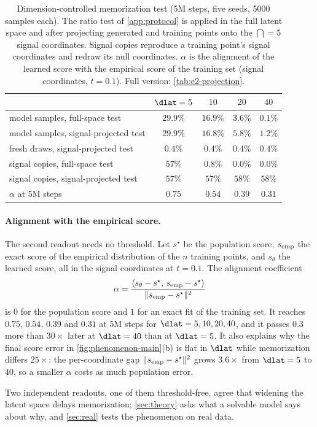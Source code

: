 \begin{table}[t]
  \centering\small
  \caption{Dimension-controlled memorization test (5M steps, five seeds, 5000 samples each). The ratio test of \cref{app:protocol} is applied in the full latent space and after projecting generated and training points onto the $\dint=5$ signal coordinates. Signal copies reproduce a training point's signal coordinates and redraw its null coordinates. $\alpha$ is the alignment of the learned score with the empirical score of the training set (signal coordinates, $t=0.1$). Full version: \cref{tab:e2-projection}.}
  \label{tab:projection-main}
  \begin{tabular}{lcccc}
    \toprule
     & $\dlat=5$ & $10$ & $20$ & $40$\\
    \midrule
    model samples, full-space test & $29.9\%$ & $16.9\%$ & $3.6\%$ & $0.1\%$\\
    model samples, signal-projected test & $29.9\%$ & $16.8\%$ & $5.8\%$ & $1.2\%$\\
    fresh draws, signal-projected test & $0.4\%$ & $0.4\%$ & $0.4\%$ & $0.4\%$\\
    signal copies, full-space test & $57\%$ & $0.8\%$ & $0.0\%$ & $0.0\%$\\
    signal copies, signal-projected test & $57\%$ & $57\%$ & $58\%$ & $58\%$\\
    \midrule
    $\alpha$ at 5M steps & $0.75$ & $0.54$ & $0.39$ & $0.31$\\
    \bottomrule
  \end{tabular}
\end{table}

\paragraph{Alignment with the empirical score.}
The second readout needs no threshold. Let $s^\star$ be the population score, $s_{\rm emp}$ the exact score of the empirical distribution of the $n$ training points, and $s_\theta$ the learned score, all in the signal coordinates at $t=0.1$. The alignment coefficient
\begin{equation}
  \alpha=\frac{\langle s_\theta-s^\star,\,s_{\rm emp}-s^\star\rangle}{\|s_{\rm emp}-s^\star\|^2}
\end{equation}
is $0$ for the population score and $1$ for an exact fit of the training set. It reaches $0.75$, $0.54$, $0.39$ and $0.31$ at 5M steps for $\dlat=5,10,20,40$, and it passes $0.3$ more than $30\times$ later at $\dlat=40$ than at $\dlat=5$. It also explains why the final score error in \cref{fig:phenomenon-main}(b) is flat in $\dlat$ while memorization differs $25\times$: the per-coordinate gap $\|s_{\rm emp}-s^\star\|^2$ grows $3.6\times$ from $\dlat=5$ to $40$, so a smaller $\alpha$ costs as much population error.

Two independent readouts, one of them threshold-free, agree that widening the latent space delays memorization; \cref{sec:theory} asks what a solvable model says about why, and \cref{sec:real} tests the phenomenon on real data.
